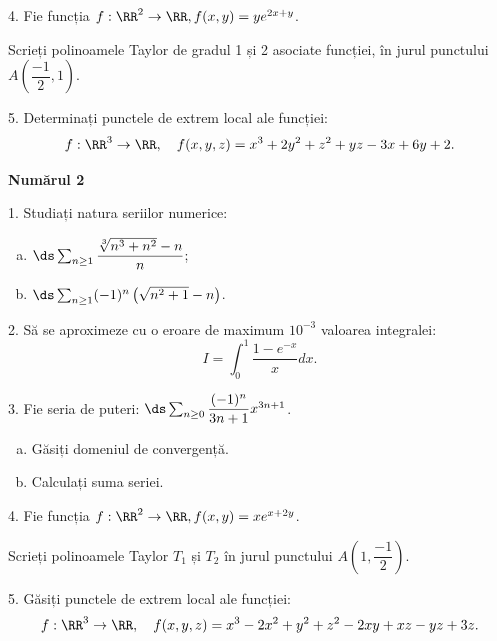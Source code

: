 \vspace{0.5cm}

4. Fie funcția $ f : \RR^2 \to \RR, f(x, y) = ye^{2x + y} $.

Scrieți polinoamele Taylor de gradul 1 și 2 asociate funcției, în jurul punctului
$ A\left( \dfrac{-1}{2}, 1 \right) $.

\vspace{0.5cm}

5. Determinați punctele de extrem local ale funcției:
\[
  f : \RR^3 \to \RR, \quad f(x, y, z) = x^3 + 2y^2 + z^2 + yz - 3x + 6y + 2.
\]

\vspace{1cm}

\textbf{Numărul 2}

1. Studiați natura seriilor numerice:
\begin{enumerate}[(a)]
\item $ \ds\sum_{n \geq 1} \dfrac{\sqrt[3]{n^3 + n^2} - n}{n} $;
\item $ \ds\sum_{n \geq 1} (-1)^n \left( \sqrt{n^2 + 1} - n \right) $.
\end{enumerate}

\vspace{0.5cm}

2. Să se aproximeze cu o eroare de maximum $ 10^{-3}$ valoarea integralei:
\[
  I = \int_0^1 \dfrac{1 - e^{-x}}{x} dx.
\]

\vspace{0.5cm}

3. Fie seria de puteri: $ \ds\sum_{n \geq 0} \dfrac{(-1)^n}{3n + 1} x^{3n + 1} $.
\begin{enumerate}[(a)]
\item Găsiți domeniul de convergență.
\item Calculați suma seriei.
\end{enumerate}

\vspace{0.5cm}

4. Fie funcția $ f : \RR^2 \to \RR, f(x, y) = xe^{x + 2y} $.

Scrieți polinoamele Taylor $ T_1 $ și $ T_2 $ în jurul punctului
$ A\left(1, \dfrac{-1}{2}\right) $.

\vspace{0.5cm}

5. Găsiți punctele de extrem local ale funcției:
\[
  f : \RR^3 \to \RR, \quad f(x, y, z) = x^3 - 2x^2 + y^2 + z^2 - 2xy + xz - yz + 3z.
\]

